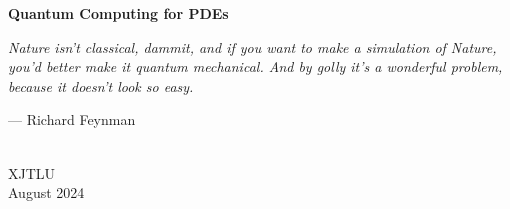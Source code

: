 \begin{titlepage}
  \centering
  \vspace*{3cm}
  {\Huge\bfseries Quantum Computing for PDEs\par}
  \vspace{2cm}
  \begin{minipage}{0.8\textwidth}\itshape
    Nature isn't classical, dammit, and if you want to make a simulation of
    Nature, you'd better make it quantum mechanical. And by golly it's a
    wonderful problem, because it doesn't look so easy.
  \end{minipage}
  \par\vspace{0.5cm}
  {\raggedleft --- Richard Feynman\par}
  \vspace{2cm}
  {\\[0.3em] XJTLU\\[0.3em] August 2024\par}
\end{titlepage}
